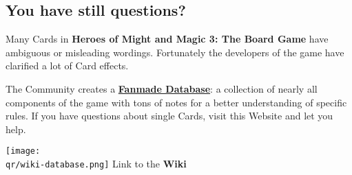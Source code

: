 \begin{multicols*}{2}
\vspace*{1em}
\subsection*{You have still questions?}
Many Cards in \textbf{Heroes of Might and Magic 3: The Board Game} have ambiguous or misleading wordings.
Fortunately the developers of the game have clarified a lot of Card effects.\par
\begin{minipage}{5.7cm}
    The Community creates a \href{https://homm3bg.wiki/}{\textbf{Fanmade Database}}: a collection of nearly all components of the game with tons of notes for a better understanding of specific rules. If you have questions about single Cards, visit this Website and let you help.
\end{minipage}
\hfill
\begin{minipage}{2cm}
    \begin{center}
        \texttt{[image: \\qr/wiki-database.png]}
        \scriptsize Link to the \textbf{Wiki}
    \end{center}
\end{minipage}\par

\end{multicols*}
